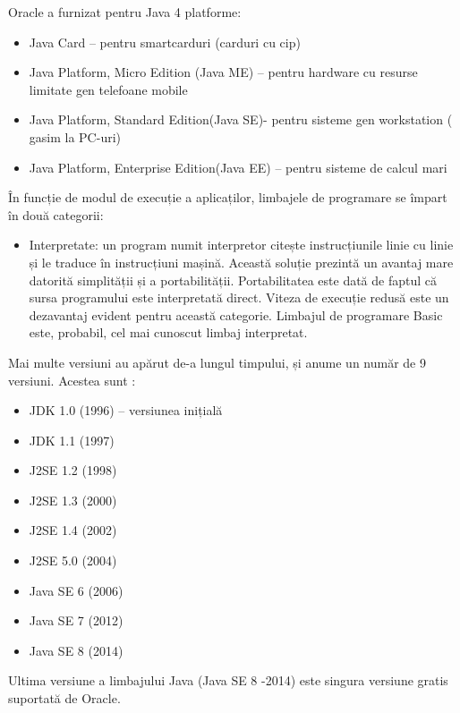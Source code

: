 \documentclass[12pt]{book}
\begin{document}
Oracle a furnizat pentru Java 4 platforme:
\begin{addmargin}[4em]{1em}
\begin{itemize}
	\item Java Card – pentru smartcarduri (carduri cu cip)
	\item Java Platform, Micro Edition (Java ME) – pentru hardware cu resurse limitate gen telefoane mobile
	\item Java Platform, Standard Edition(Java SE)- pentru sisteme gen workstation ( gasim la PC-uri)
	\item Java Platform, Enterprise Edition(Java EE) – pentru sisteme de calcul mari
\end{itemize}
\end{addmargin}
\bigbreak
În funcție de modul de execuție a aplicaților, limbajele de programare se împart în două categorii:
\begin{addmargin}[4em]{1em}
	\begin{itemize}
		\item Interpretate: un program numit interpretor citește instrucțiunile linie cu linie și le traduce în instrucțiuni mașină. Această soluție prezintă un avantaj mare datorită simplității și a portabilității. Portabilitatea este dată de faptul că sursa programului este interpretată direct. Viteza de execuție redusă este un dezavantaj evident pentru această categorie. Limbajul de programare Basic este, probabil, cel mai cunoscut limbaj interpretat.
	\end{itemize}
\end{addmargin}
\bigbreak
Mai multe versiuni au apărut de-a lungul timpului, și anume un număr de 9 versiuni. Acestea sunt :
\begin{addmargin}[4em]{1em}
\begin{itemize}
\item JDK 1.0 (1996) – versiunea inițială
\item JDK 1.1 (1997)
\item J2SE 1.2 (1998)
\item J2SE 1.3 (2000)
\item J2SE 1.4 (2002)
\item J2SE 5.0 (2004)
\item Java SE 6 (2006)
\item Java SE 7 (2012)
\item Java SE 8 (2014)
\end{itemize}
\end{addmargin}
\bigbreak
Ultima versiune a limbajului Java (Java SE 8 -2014) este singura versiune gratis suportată de Oracle.
	
\end{document}
